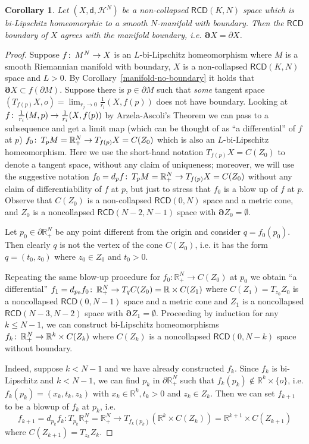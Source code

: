\documentclass[a4paper]{amsart}
\theoremstyle{plain}
\newtheorem{corollary}[lemma]{Corollary}
\theoremstyle{definition}
\numberwithin{equation}{section}
\newcommand{\R}{\mathbb{R}}
\newcommand{\RCD}{\mathsf{RCD}}
\newcommand{\sfd}{\mathsf d}
\newcommand{\cH}{\mathcal{H}}
\def\co{\colon\thinspace}
\newcommand{\bRCD}{\boldsymbol\partial}
\begin{document}
{{\begin{corollary}\label{cor:bilip}
Let $(X,\sfd,\cH^{N})$ be a non-collapsed  $\RCD(K,N)$ space which is  bi-Lipschitz homeomorphic to a smooth $N$-manifold with boundary. 
Then the $\RCD$ boundary of $X$ agrees with the manifold boundary, i.e. $\bRCD X=\partial X$.
\end{corollary}
\begin{proof}
Suppose $f\co M^N\to X$ is an $L$-bi-Lipschitz homeomorphism where $M$ is a smooth Riemannian manifold with boundary, 
$X$ is a non-collapsed $\RCD(K,N)$ space and $L>0$. By Corollary~\ref{manifold-no-boundary} it holds that 
$\bRCD X\subset f(\partial M)$.
Suppose there is $p\in\partial M$ such that  \emph{some} tangent space $(T_{f(p)}X,o)=\lim_{r_j\to 0} \frac{1}{r_i}(X,f(p))$ does not have boundary.   
Looking at $f\co \frac{1}{r_i}(M,p)\to  \frac{1}{r_i}(X,f(p))$  by Arzela-Ascoli's Theorem we can pass to a subsequence and get a limit map (which can be thought of as ``a differential'' of $f$ at $p$) $f_0\co T_pM=\R^N_+\to T_{f(p)}X=C(Z_0)$ which is also an $L$-bi-Lipschitz homeomorphism.{   Here we use the short-hand notation $T_{f(p)}X=C(Z_0)$ to denote a tangent space, without any claim of uniqueness; moreover, we will use the suggestive notation $f_0=d_{p} f\co T_pM=\R^N_+\to T_{f(p)}X=C(Z_0)$ without any claim of differentiability of $f$ at $p$, but just to stress that $f_{0}$ is a blow up of $f$ at $p$.}
Observe that $C(Z_0)$ is  a non-collapsed $\RCD(0,N)$ space and a metric cone, and $Z_0$ is a noncollapsed $\RCD(N-2,N-1)$ space with $\bRCD Z_0=\emptyset$.


 Let $p_0\in \partial \R^N_+$ be any point different from the origin { and consider $q=f_0(p_0)$}.
Then clearly $q$ is not the vertex of the cone $C(Z_0)$, i.e. it has the form  $q=(t_0,z_0)$ where $z_0\in Z_0$ and $t_0>0$. 

 {Repeating the same blow-up procedure for $f_0: \R^N_+\to C(Z_{0})$ at $p_0$ we obtain ``a differential''} $f_1=d_{p_0}{f_0}\co  \R^N_+\to T_{q}C(Z_0)=\R\times C(Z_1)$ where $C(Z_1)=T_{z_0}Z_0$  is  a noncollapsed $\RCD(0,N-1)$ space and a metric cone and $Z_1$ is a noncollapsed $\RCD(N-3,N-2)$ space with $\bRCD Z_1=\emptyset$.  Proceeding by induction for any $k\le N-1$, we can construct bi-Lipschitz homeomorphisms $f_k\co \R^N_+\to \R^k\times C(Z_k)$ where $C(Z_k)$ is a noncollapsed $\RCD(0,N-k)$ space without boundary.

 Indeed, suppose $k<N-1$ and we have already constructed $f_k$. Since $f_k$ is bi-Lipschitz and $k<N-1$, we can find  $p_k$ in $\partial \R^N_+$ such that { $f_{k}(p_k)\notin \R^k\times \{o\}$}, i.e. $f_{k}(p_k)=(x_k, t_k, z_k)$ with
$x_k\in \R^k, t_k>0$ and $z_k\in Z_k$. Then we can set $f_{k+1}$ { to be a blowup of $f_{k}$ at $p_{k}$, i.e. $$f_{k+1}=d_{p_{k}}{f_k}:T_{p_k}\R^N_+=\R^N_+\to T_{f_{k}(p_k)} (\R^k\times C(Z_k))=\R^{k+1}\times C(Z_{k+1})$$} where $ C(Z_{k+1})=T_{z_k}Z_k$.


\end{proof}}}
\end{document}
